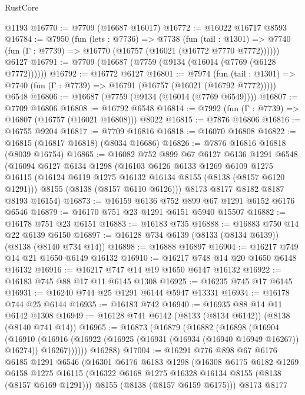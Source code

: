 \begin{lexlean}{RustCore}
\begin{coremodule}
    @1193
@16770 := @7709 (@16687 @16017)
@16772 := @16022 @16717 @8593
@16784 := @7950
    (fun (lets : @7736) =>
    @7738
      (fun (tail : @1301) =>
      @7740 (fun (Γ : @7739) => @16770 (@16757 (@16021 (@16772 @7770 @7772))))))
    @6127
@16791 := @7709 (@16687 (@7759 (@9134 (@16014 (@7769 (@6128 @7772))))))
@16792 := @16772 @6127
@16801 := @7974
    (fun (tail : @1301) => @7740 (fun (Γ : @7739) => @16791 (@16757 (@16021 (@16792 @7772)))))
    @6548
@16806 := @16687 (@7759 (@9134 (@16014 (@7769 @6549))))
@16807 := @7709 @16806
@16808 := @16792 @6548
@16814 := @7992 (fun (Γ : @7739) => @16807 (@16757 (@16021 @16808))) @8022
@16815 := @7876 @16806
@16816 := @16755 @9204
@16817 := @7709 @16816
@16818 := @16070 @16808
@16822 := @16815 (@16817 @16818) (@8034 @16686)
@16826 := @7876 @16816 @16818 (@8039 @16754)
@16865 := @16082
    @752
    @899
    @67
    @6127
    @6136
    @1291
    @6548
    (@16094
      @6127
      @6134
      @1298
      (@16103
        @6126
        @6133
        @1269
        @6109
        @1275
        @16115
        (@16124 @6119 @1275 @16132 @16134 @8155 (@8138 (@8157 @6120 @1291)))
        @8155
        (@8138 (@8157 @6110 @6126)))
      @8173
      @8177
      @8182
      @8187
      @8193
      @16154)
@16873 := @16159 @6136 @752 @899 @67 @1291 @6152 @6176 @6546
@16879 := @16170 @751 @23 @1291 @6151 @5940 @15507
@16882 := @16178 @751 @23 @6151
@16883 := @16183 @735
@16888 := @16883 @750 @14 @22 @6139 @6150
@16897 := @16128 @734 @6139 (@8133 (@8134 @6139)) (@8138 (@8140 @734 @14))
@16898 := @16888 @16897
@16904 := @16217 @749 @14 @21 @1650 @6149 @16132
@16910 := @16217 @748 @14 @20 @1650 @6148 @16132
@16916 := @16217 @747 @14 @19 @1650 @6147 @16132
@16922 := @16183 @745 @88 @17 @11 @6145 @1308
@16925 := @16235 @745 @17 @6145
@16931 := @16240 @744 @25 @1291 @6144 @5947 @13331
@16934 := @16178 @744 @25 @6144
@16935 := @16183 @742
@16940 := @16935 @88 @14 @11 @6142 @1308
@16949 := @16128 @741 @6142 (@8133 (@8134 @6142)) (@8138 (@8140 @741 @14))
@16965 := @16873
    (@16879
      (@16882
        (@16898
          (@16904
            (@16910
              (@16916 (@16922 (@16925 (@16931 (@16934 (@16940 @16949 @16267)) @16274)) @16267))))))
      @16288)
@17004 := @16291
    @776
    @898
    @67
    @6176
    @6185
    @1291
    @6546
    (@16301
      @6176
      @6183
      @1298
      (@16308
        @6175
        @6182
        @1269
        @6158
        @1275
        @16115
        (@16322 @6168 @1275 @16328 @16134 @8155 (@8138 (@8157 @6169 @1291)))
        @8155
        (@8138 (@8157 @6159 @6175)))
      @8173
      @8177

\end{coremodule}
\end{lexlean}
